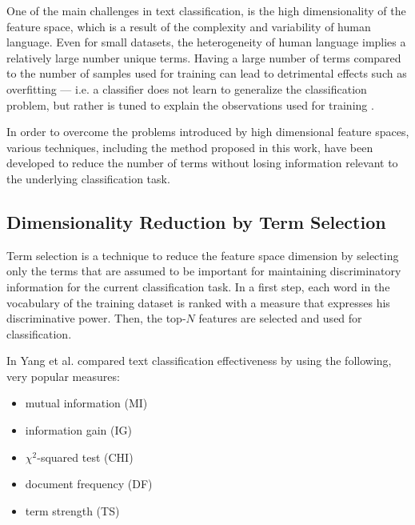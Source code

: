 One of the main challenges in text classification, is the high dimensionality of
the feature space, which is a result of the complexity and variability of human
language. Even for small datasets, the heterogeneity of human language implies a
relatively large number unique terms. Having a large number of terms compared to the number
of samples used for training can lead to detrimental effects such as overfitting
--- i.e. a classifier does not learn to generalize the classification problem,
but rather is tuned to explain the observations used for training
\cite{sebastiani2002machine}.

In order to overcome the problems introduced by high dimensional feature spaces,
various techniques, including the method proposed in this work, have been developed 
to reduce the number of terms without losing information relevant to the underlying 
classification task. 

\subsection{Dimensionality Reduction by Term Selection}
Term selection is a technique to reduce the feature space dimension by
selecting only the terms that are assumed to be important for maintaining 
discriminatory information for the current classification task.
In a first step, each word in the vocabulary of the training dataset is ranked
with a measure that expresses his discriminative power. Then, the top-$N$ features 
are selected and used for classification. 

In \cite{yang1997comparative} Yang et al. compared text classification
effectiveness by using the following, very popular measures:

\begin{itemize}
  \item mutual information (MI)
  \item information gain (IG)
  \item $\chi^2$-squared test (CHI)  
  \item document frequency (DF)
  \item term strength (TS)
\end{itemize}
  
